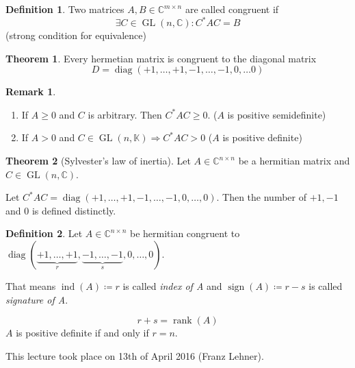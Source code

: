 \documentclass[a4paper,landscape,twocolumn]{article}
\newcommand\meta[3]{This #1 took place on #2 (#3).\par}
\theoremstyle{definition}
\newtheorem{theorem}{Theorem}
\newtheorem{defi}{Definition}
\newtheorem{rem}{Remark}
\begin{document}
\begin{defi}
  \label{def-8.23}
  Two matrices $A,B \in \mathbb C^{m\times n}$ are called congruent if
  \[ \exists C \in \operatorname{GL}(n, \mathbb C): C^* AC = B \]
  (strong condition for equivalence)
\end{defi}
\begin{theorem}
  \label{satz-8.24}
  Every hermetian matrix is congruent to the diagonal matrix
  \[ D = \operatorname{diag}(+1, \ldots, +1, -1, \ldots, -1, 0, \ldots 0) \]
\end{theorem}

\begin{rem}
  \label{ue-8.26}
  \begin{enumerate}
    \item If $A \geq 0$ and $C$ is arbitrary. Then $C^* A C \geq 0$. ($A$ is positive semidefinite)
    \item
      If $A > 0$ and $C \in \operatorname{GL}(n,\mathbb K) \Rightarrow C^* A C > 0$
      ($A$ is positive definite)
  \end{enumerate}
\end{rem}

\begin{theorem}[Sylvester's law of inertia]
  Let $A \in \mathbb C^{n\times n}$ be a hermitian matrix and $C \in \operatorname{GL}(n, \mathbb C)$.

  Let $C^* AC = \operatorname{diag}(+1, \ldots, +1, -1, \ldots, -1, 0, \ldots, 0)$.
  Then the number of $+1, -1$ and $0$ is defined distinctly.
\end{theorem}

\begin{defi}
  \label{defi-8.28}
  Let $A \in \mathbb C^{n \times n}$ be hermitian
  congruent to $\operatorname{diag}(\underbrace{+1, \ldots, +1}_{r}, \underbrace{-1, \ldots, -1}_{s}, 0, \ldots, 0)$.

  That means $\operatorname{ind}(A) \coloneqq r$ is called \emph{index of A}
  and $\operatorname{sign}(A) \coloneqq r - s$ is called \emph{signature of A}.

  \[ r + s = \operatorname{rank}(A) \]
  $A$ is positive definite if and only if $r = n$.
\end{defi}

\meta{lecture}{13th of April 2016}{Franz Lehner}
\end{document}
